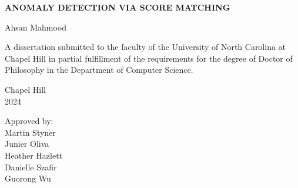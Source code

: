 \begin{titlepage}
\begin{center}


\vspace{2in}
\begin{singlespace}
\bf
ANOMALY DETECTION VIA SCORE MATCHING
\end{singlespace}


\vspace{61pt} %
\large Ahsan Mahmood
\end{center}



\vspace{50pt}
\begin{singlespace}
\noindent \large
A dissertation submitted to the faculty of the University of North Carolina at Chapel Hill
in partial fulfillment of the requirements for the degree of Doctor of Philosophy in
the Department of Computer Science.
\end{singlespace}


\vspace{50pt}
\begin{center}
\begin{singlespace} \large
Chapel Hill\\
2024
\end{singlespace}
\end{center}


\vfill
\begin{flushright}
\begin{minipage}[t]{1.5in} \large
Approved by:\\
Martin Styner \\
Junier Oliva \\
Heather Hazlett \\
Danielle Szafir \\
Guorong Wu

\end{minipage}
\end{flushright}

\end{titlepage}
